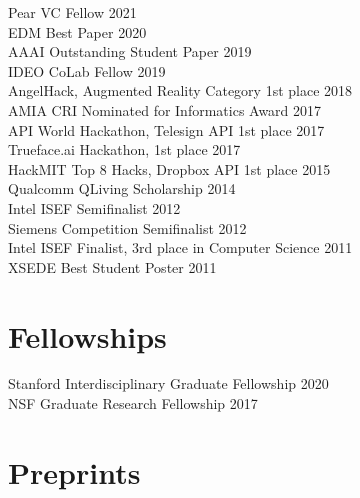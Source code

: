 \documentclass[margin, 10pt]{res} %
\begin{document}
\begin{resume}
Pear VC Fellow \hfill 2021 \\
EDM Best Paper \hfill 2020 \\
AAAI Outstanding Student Paper \hfill 2019 \\
IDEO CoLab Fellow \hfill 2019 \\
AngelHack, Augmented Reality Category 1st place \hfill 2018 \\
AMIA CRI Nominated for Informatics Award \hfill 2017 \\
API World Hackathon, Telesign API 1st place \hfill 2017 \\
Trueface.ai Hackathon, 1st place \hfill 2017 \\
HackMIT Top 8 Hacks, Dropbox API 1st place \hfill 2015 \\
Qualcomm QLiving Scholarship \hfill 2014 \\
Intel ISEF Semifinalist \hfill 2012 \\
Siemens Competition Semifinalist \hfill 2012 \\
Intel ISEF Finalist, 3rd place in Computer Science \hfill 2011 \\
XSEDE Best Student Poster \hfill 2011 \\

\section{Fellowships}
Stanford Interdisciplinary Graduate Fellowship \hfill 2020 \\
NSF Graduate Research Fellowship \hfill 2017 \\




\section{Preprints}


\end{resume}
\end{document}
